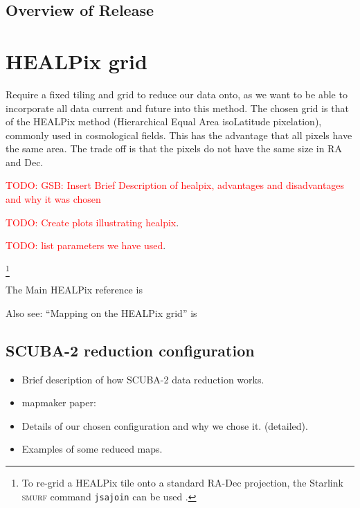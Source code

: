 \documentclass[usenatbib]{mn2e}
\newcommand{\todo}[1]{\textcolor{red}{TODO: #1}}
\begin{document}
\subsection{Overview of Release}







\section{HEALPix grid }
Require a fixed tiling and grid to reduce our data onto, as we want to
be able to incorporate all data current and future into this
method. The chosen grid is that of the HEALPix method (Hierarchical
Equal Area isoLatitude pixelation), commonly used in cosmological
fields. This has the advantage that all pixels have the same area. The
trade off is that the pixels do not have the same size in RA and Dec.

\todo{GSB: Insert Brief Description of healpix, advantages and
  disadvantages and why it was chosen }

\todo{Create plots illustrating healpix}.

\todo{list parameters we have used}.

\footnote{To re-grid a HEALPix tile onto a standard RA-Dec projection,
  the Starlink \textsc{smurf} command \texttt{jsajoin} can be used
  \citep{SUN258}.}

The Main HEALPix reference is \citep{2005ApJ...622..759G}

Also see: ``Mapping on the HEALPix grid'' is \citep{2007MNRAS.381..865C}



\subsection{SCUBA-2 reduction configuration}

\citep{2013MNRAS.430.2513H}

\begin{itemize}
\item Brief description of how SCUBA-2 data reduction works.
\item mapmaker paper: \citep{2013MNRAS.430.2545C}
\item Details of our chosen configuration and why we chose it. (detailed).
\item Examples of some reduced maps.
\end{itemize}
\end{document}
